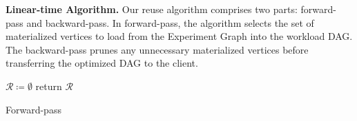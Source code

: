 \textbf{Linear-time Algorithm.}
Our reuse algorithm comprises two parts: forward-pass and backward-pass.
In forward-pass, the algorithm selects the set of materialized vertices to load from the Experiment Graph into the workload DAG.
The backward-pass prunes any unnecessary materialized vertices before transferring the optimized DAG to the client.
\begin{algorithm}[h]
$\mathcal{R} \coloneqq \emptyset$\;
return $\mathcal{R}$\;
\caption{Forward-pass}\label{forward-pass}
\end{algorithm}

